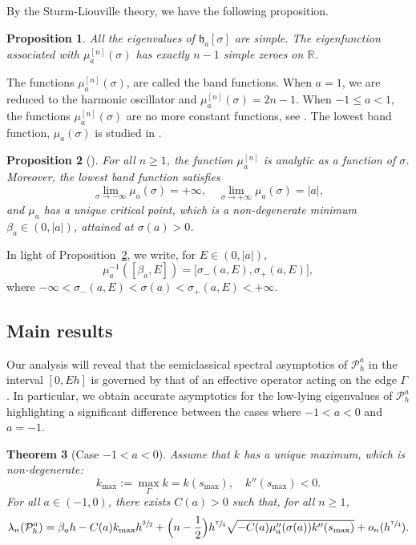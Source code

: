 \documentclass[JEP,XML,SOM,Unicode,NoFloatCountersInSection,published]{cedram}
\newcommand{\cP}{\mathcal{P}}
\theoremstyle{plain}
\newtheorem{theorem}{Theorem}[section]
\newtheorem{proposition}[theorem]{Proposition}
\theoremstyle{definition}
\newcommand{\R}{\mathbb{R}}
\begin{document}
By the Sturm-Liouville theory, we have the following proposition.

\begin{proposition}\label{lem.simple}
All the eigenvalues of $\mathfrak h_a[\sigma]$ are simple. 
The eigenfunction associated with $\mu^{[n]}_{a}(\sigma)$ has exactly $n-1$ simple zeroes on $\R$.
\end{proposition}

The functions $\mu^{[n]}_{a}(\sigma)$, are called the band functions. When $a=1$, we are reduced to the harmonic oscillator and $\mu^{[n]}_a(\sigma)=2n-1$. When $-1\leq a<1$, the functions $\mu^{[n]}_a(\sigma)$ are no more constant functions, see \cite{HPRS16}. The lowest band function, $\mu_{a}(\sigma)$ is studied in \cite{AK20}.

\begin{proposition}[\cite{AK20, HPRS16}]\label{prop.mu-a}
For all $n\geq 1$, the function $\mu^{[n]}_{a}$ is analytic as a function of $\sigma$. Moreover, the lowest band function satisfies
\begin{equation}\label{eq:limit-mu-a}
\lim\limits_{\sigma\to-\infty}\mu_a(\sigma)=+\infty,\quad \lim\limits_{\sigma\to+\infty}\mu_a(\sigma)=|a|,
\end{equation}
and $\mu_a$ has a unique critical point, which is a non-degenerate minimum $\beta_a\in(0,|a|)$, attained at $\sigma(a)>0$.
\end{proposition}
In light of Proposition~\ref{prop.mu-a}, we write, for $E\in(0,|a|)$,
\begin{equation}\label{eq:xi-pm}
\mu^{-1}_a([\beta_a,E])=\bigl[\sigma_-(a,E),\sigma_+(a,E)\bigr],
\end{equation}
where $-\infty<\sigma_-(a,E)<\sigma(a)<\sigma_+(a,E)<+\infty$.

\subsection{Main results}
Our analysis will reveal that the semiclassical spectral asymptotics of $\cP^a_h$ in the interval $[0,Eh]$ is governed by that of an effective operator acting on the edge $\Gamma$. In particular, we obtain accurate asymptotics for the low-lying eigenvalues of $\cP^a_h$ highlighting a significant difference between the cases where $-1<a<0$ and $a=-1$.

\begin{theorem}[Case $-1<a<0$]\label{corol.a>-1}
Assume that $k$ has a unique maximum, which is non-degenerate:
\[
k_{\max}:=\max_\Gamma k=k(s_{\max}),\quad k''(s_{\max})<0.
\]
For all $a\in(-1,0)$, there exists $C(a)>0$ such that, for all $n\geq 1$,
\[
\lambda_n(\cP^a_h)=
\beta_a h-C(a)k_{\max}h^{\sfrac32}+\Bigl(n-\frac 12\Bigr)h^{\sfrac74}\sqrt{-C(a)\mu''_a(\sigma(a))k''(s_{\max})}+o_n(h^{\sfrac74}).
\] 
\end{theorem}
\end{document}
